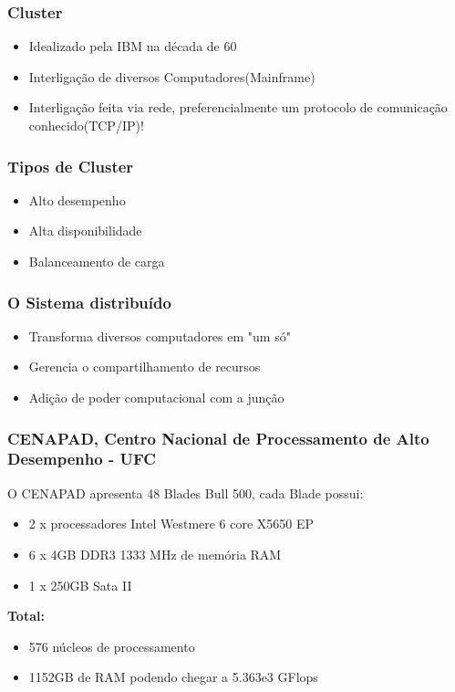 \documentclass{beamer}
\begin{document}
\begin{frame}
    \frametitle{Cluster}

\begin{itemize}
    \item Idealizado pela IBM na década de 60
    \item Interligação de diversos Computadores(Mainframe)
    \item Interligação feita via rede, preferencialmente um protocolo de comunicação conhecido(TCP/IP)!
\end{itemize}
\end{frame}

\begin{frame}
    \frametitle{Tipos de Cluster}

\begin{itemize}
    \item Alto desempenho
    \item Alta disponibilidade
    \item Balanceamento de carga
\end{itemize}

\end{frame}

\begin{frame}
    \frametitle{O Sistema distribuído}

\begin{itemize}
    \item Transforma diversos computadores em "um só"
    \item Gerencia o compartilhamento de recursos
    \item Adição de poder computacional com a junção
\end{itemize}
\end{frame}

\begin{frame}
    \frametitle{CENAPAD, Centro Nacional de Processamento de Alto Desempenho - UFC}
    
    O CENAPAD apresenta 48 Blades Bull 500, cada Blade possui:
    \begin{itemize}
        \item 2 x processadores Intel Westmere 6 core X5650 EP
        \item 6 x 4GB DDR3 1333 MHz de memória RAM
        \item 1 x 250GB Sata II
    \end{itemize}

    \textbf{Total:}
    \begin{itemize}
        \item 576 núcleos de processamento
        \item 1152GB de RAM podendo chegar a 5.363e3 GFlops
    \end{itemize}
\end{frame}
\end{document}
